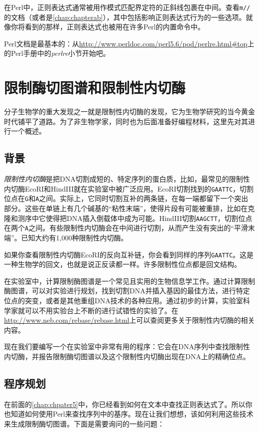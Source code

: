 在Perl中，正则表达式通常被用作模式匹配界定符的正斜线包裹在中间。查看\verb|m//|的文档（或者是\autoref{chap:chapterab}），其中包括影响正则表达式行为的一些选项。就像你将看到的那样，正则表达式也被用在许多Perl的内置命令中。

Perl文档是最基本的：从\href{http://www.perldoc.com/perl5.6/pod/perlre.html\#top}{http://www.perldoc.com/perl5.6/pod/perlre.html\#top}上的Perl手册中的\textit{perlre}小节开始吧。

\section{限制酶切图谱和限制性内切酶}
分子生物学的重大发现之一就是限制性内切酶的发现，它为生物学研究的当今黄金时代铺平了道路。为了非生物学家，同时也为后面准备好编程材料，这里先对其进行一个概述。

\subsection{背景}
\textit{限制性内切酶}是把DNA切割成短的、特定序列的蛋白质，比如，最常见的限制性内切酶EcoRI和HindIII就在实验室中被广泛应用。EcoRI切割找到的\verb|GAATTC|，切割位点在\verb|G|和\verb|A|之间。实际上，它同时切割互补的两条链，在每一端都留下一个突出部分。这些在单链上有几个碱基的“粘性末端”，使得片段有可能被重排，比如在克隆和测序中它使得把DNA插入倒载体中成为可能。HindIII切割\verb|AAGCTT|，切割位点在两个\verb|A|之间。有些限制性内切酶会在中间进行切割，从而产生没有突出的“平滑末端”。已知大约有1,000种限制性内切酶。

如果你查看限制性内切酶EcoRI的反向互补链，你会看到同样的序列\verb|GAATTC|。这是一种生物学的回文，也就是说正反读都一样。许多限制性位点都是回文结构。

在实验室中，计算限制酶图谱是一个常见且实用的生物信息学工作。通过计算限制酶图谱，可以对实验进行规划，找到切割DNA并插入基因的最佳方法，进行特定位点的突变，或者是其他重组DNA技术的各种应用。通过初步的计算，实验室科学家就可以不用实验台上不断的进行试错性的实验了。在\href{http://www.neb.com/rebase/rebase.html}{http://www.neb.com/rebase/rebase.html}上可以查阅更多关于限制性内切酶的相关内容。

现在我们要编写一个在实验室中非常有用的程序：它会在DNA序列中查找限制性内切酶，并报告限制酶切图谱以及这个限制性内切酶出现在DNA上的精确位点。

\subsection{程序规划}
在前面的\autoref{chap:chpater5}中，你已经看到如何在文本中查找正则表达式了。所以你也知道如何使用Perl来查找序列中的基序。现在让我们想想，该如何利用这些技术来生成限制酶切图谱。下面是需要询问的一些问题：

